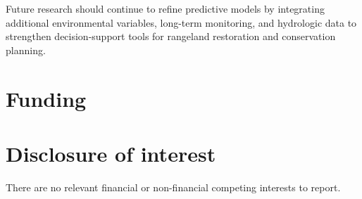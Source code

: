 \documentclass[review]{elsarticle}
\begin{document}
Future research should continue to refine predictive models by integrating additional environmental variables, long-term monitoring, and hydrologic data to strengthen decision-support tools for rangeland restoration and conservation planning.

\section*{Funding}

 

\section*{Disclosure of interest}

There are no relevant financial or non-financial competing interests to report.



\end{document}
